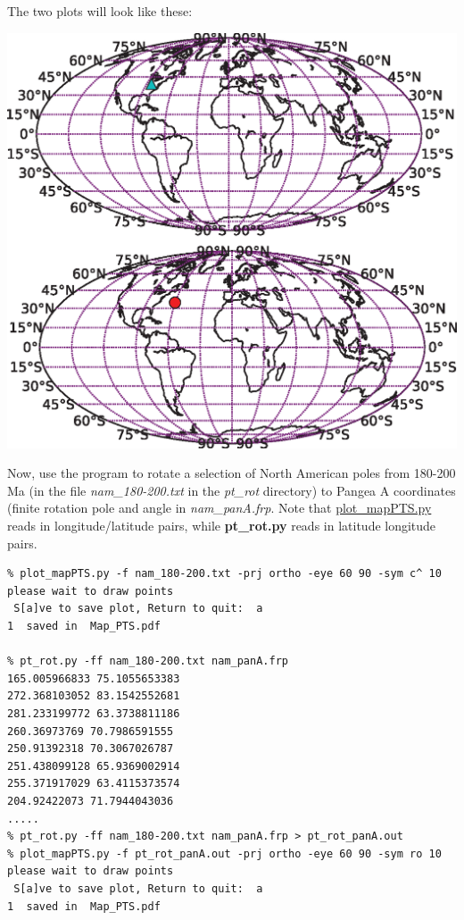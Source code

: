\documentclass[11pt]{book}
\begin{document}
{{{The two plots will look like these:

\includegraphics[width=15cm]{EPSfiles/pt_rot.eps}




Now, use the program to rotate a selection of North American poles from 180-200 Ma (in the file {\it nam\_180-200.txt} in the {\it pt\_rot} directory) to Pangea A coordinates (finite rotation pole and angle in {\it nam\_panA.frp}.   Note that \href{#plot_mapPTS.py}{plot\_mapPTS.py} reads in longitude/latitude pairs, while {\bf pt\_rot.py} reads in latitude longitude pairs.   

\begin{verbatim}
% plot_mapPTS.py -f nam_180-200.txt -prj ortho -eye 60 90 -sym c^ 10
please wait to draw points
 S[a]ve to save plot, Return to quit:  a
1  saved in  Map_PTS.pdf

% pt_rot.py -ff nam_180-200.txt nam_panA.frp
165.005966833 75.1055653383
272.368103052 83.1542552681
281.233199772 63.3738811186
260.36973769 70.7986591555
250.91392318 70.3067026787
251.438099128 65.9369002914
255.371917029 63.4115373574
204.92422073 71.7944043036
.....
% pt_rot.py -ff nam_180-200.txt nam_panA.frp > pt_rot_panA.out
% plot_mapPTS.py -f pt_rot_panA.out -prj ortho -eye 60 90 -sym ro 10
please wait to draw points
 S[a]ve to save plot, Return to quit:  a
1  saved in  Map_PTS.pdf
\end{verbatim}

}}}
\end{document}
